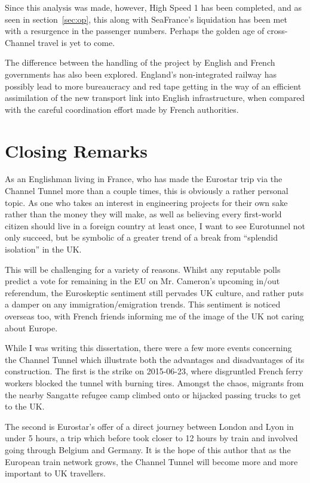 \documentclass[12pt]{article} %
\begin{document}
Since this analysis was made, however, High Speed 1 has been completed, and as seen in section~\ref{sec:op}, this along with SeaFrance's liquidation has been met with a resurgence in the passenger numbers. Perhaps the golden age of cross-Channel travel is yet to come.

The difference between the handling of the project by English and French governments has also been explored. England's non-integrated railway has possibly lead to more bureaucracy and red tape getting in the way of an efficient assimilation of the new transport link into English infrastructure, when compared with the careful coordination effort made by French authorities.

\section{Closing Remarks}
As an Englishman living in France, who has made the Eurostar trip via the Channel Tunnel more than a couple times, this is obviously a rather personal topic. As one who takes an interest in engineering projects for their own sake rather than the money they will make, as well as believing every first-world citizen should live in a foreign country at least once, I want to see Eurotunnel not only succeed, but be symbolic of a greater trend of a break from ``splendid isolation'' in the UK.

This will be challenging for a variety of reasons. Whilst any reputable polls predict a vote for remaining in the EU on Mr. Cameron's upcoming in\slash out referendum, the Euroskeptic sentiment still pervades UK culture, and rather puts a damper on any immigration\slash emigration trends. This sentiment is noticed overseas too, with French friends informing me of the image of the UK not caring about Europe.

While I was writing this dissertation, there were a few more events concerning the Channel Tunnel which illustrate both the advantages and disadvantages of its construction. The first is the strike on 2015-06-23, where disgruntled French ferry workers blocked the tunnel with burning tires. Amongst the chaos, migrants from the nearby Sangatte refugee camp climbed onto or hijacked passing trucks to get to the UK.

The second is Eurostar's offer of a direct journey between London and Lyon in under 5 hours, a trip which before took closer to 12 hours by train and involved going through Belgium and Germany. It is the hope of this author that as the European train network grows, the Channel Tunnel will become more and more important to UK travellers.
\end{document}
